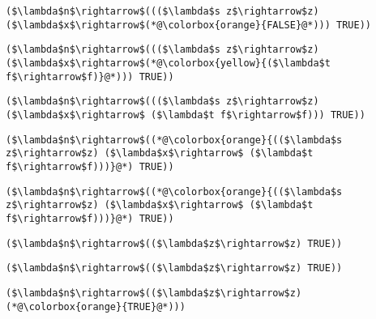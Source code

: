 \documentclass{beamer}
\begin{document}
\begin{frame}[fragile]{\CurrentSection}
\lstset{basicstyle=\ttfamily\small}\lstset{numbers=none}\lstset{language=ML}\begin{lstlisting}
($\lambda$n$\rightarrow$((($\lambda$s z$\rightarrow$z) ($\lambda$x$\rightarrow$(*@\colorbox{orange}{FALSE}@*))) TRUE))
\end{lstlisting}
\pause\lstset{language=ML}\begin{lstlisting}
($\lambda$n$\rightarrow$((($\lambda$s z$\rightarrow$z) ($\lambda$x$\rightarrow$(*@\colorbox{yellow}{($\lambda$t f$\rightarrow$f)}@*))) TRUE))
\end{lstlisting}

\end{frame}

\begin{frame}[fragile]{\CurrentSection}
\lstset{basicstyle=\ttfamily\small}\lstset{numbers=none}\lstset{language=ML}\begin{lstlisting}
($\lambda$n$\rightarrow$((($\lambda$s z$\rightarrow$z) ($\lambda$x$\rightarrow$ ($\lambda$t f$\rightarrow$f))) TRUE))
\end{lstlisting}
\pause\lstset{language=ML}\begin{lstlisting}
($\lambda$n$\rightarrow$((*@\colorbox{orange}{(($\lambda$s z$\rightarrow$z) ($\lambda$x$\rightarrow$ ($\lambda$t f$\rightarrow$f)))}@*) TRUE))
\end{lstlisting}

\end{frame}

\begin{frame}[fragile]{\CurrentSection}
\lstset{basicstyle=\ttfamily\small}\lstset{numbers=none}\lstset{language=ML}\begin{lstlisting}
($\lambda$n$\rightarrow$((*@\colorbox{orange}{(($\lambda$s z$\rightarrow$z) ($\lambda$x$\rightarrow$ ($\lambda$t f$\rightarrow$f)))}@*) TRUE))
\end{lstlisting}
\pause\lstset{language=ML}\begin{lstlisting}
($\lambda$n$\rightarrow$(($\lambda$z$\rightarrow$z) TRUE))
\end{lstlisting}

\end{frame}

\begin{frame}[fragile]{\CurrentSection}
\lstset{basicstyle=\ttfamily\small}\lstset{numbers=none}\lstset{language=ML}\begin{lstlisting}
($\lambda$n$\rightarrow$(($\lambda$z$\rightarrow$z) TRUE))
\end{lstlisting}
\pause\lstset{language=ML}\begin{lstlisting}
($\lambda$n$\rightarrow$(($\lambda$z$\rightarrow$z) (*@\colorbox{orange}{TRUE}@*)))
\end{lstlisting}

\end{frame}
\end{document}
